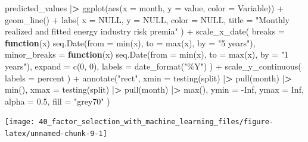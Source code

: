 \documentclass[
]{krantz}
\newenvironment{Shaded}{\begin{snugshade}}{\end{snugshade}}
\newcommand{\AttributeTok}[1]{\textcolor[rgb]{0.61,0.61,0.61}{#1}}
\newcommand{\ConstantTok}[1]{\textcolor[rgb]{0,0,0}{#1}}
\newcommand{\ControlFlowTok}[1]{\textcolor[rgb]{0.27,0.27,0.27}{\textbf{#1}}}
\newcommand{\DecValTok}[1]{\textcolor[rgb]{0.06,0.06,0.06}{#1}}
\newcommand{\ErrorTok}[1]{\textcolor[rgb]{0.14,0.14,0.14}{\textbf{#1}}}
\newcommand{\FloatTok}[1]{\textcolor[rgb]{0.06,0.06,0.06}{#1}}
\newcommand{\FunctionTok}[1]{\textcolor[rgb]{0,0,0}{#1}}
\newcommand{\NormalTok}[1]{#1}
\newcommand{\SpecialCharTok}[1]{\textcolor[rgb]{0,0,0}{#1}}
\newcommand{\StringTok}[1]{\textcolor[rgb]{0.5,0.5,0.5}{#1}}
\begin{document}
\begin{Shaded}
\begin{Highlighting}[]
\NormalTok{predicted\_values }\SpecialCharTok{|}\ErrorTok{\textgreater{}}
  \FunctionTok{ggplot}\NormalTok{(}\FunctionTok{aes}\NormalTok{(}\AttributeTok{x =}\NormalTok{ month, }\AttributeTok{y =}\NormalTok{ value, }\AttributeTok{color =}\NormalTok{ Variable)) }\SpecialCharTok{+}
  \FunctionTok{geom\_line}\NormalTok{() }\SpecialCharTok{+}
  \FunctionTok{labs}\NormalTok{(}
    \AttributeTok{x =} \ConstantTok{NULL}\NormalTok{,}
    \AttributeTok{y =} \ConstantTok{NULL}\NormalTok{,}
    \AttributeTok{color =} \ConstantTok{NULL}\NormalTok{,}
    \AttributeTok{title =} \StringTok{"Monthly realized and fitted energy industry risk premia"}
\NormalTok{  ) }\SpecialCharTok{+}
  \FunctionTok{scale\_x\_date}\NormalTok{(}
    \AttributeTok{breaks =} \ControlFlowTok{function}\NormalTok{(x) }\FunctionTok{seq.Date}\NormalTok{(}\AttributeTok{from =} \FunctionTok{min}\NormalTok{(x), }\AttributeTok{to =} \FunctionTok{max}\NormalTok{(x), }\AttributeTok{by =} \StringTok{"5 years"}\NormalTok{),}
    \AttributeTok{minor\_breaks =} \ControlFlowTok{function}\NormalTok{(x) }\FunctionTok{seq.Date}\NormalTok{(}\AttributeTok{from =} \FunctionTok{min}\NormalTok{(x), }\AttributeTok{to =} \FunctionTok{max}\NormalTok{(x), }\AttributeTok{by =} \StringTok{"1 years"}\NormalTok{),}
    \AttributeTok{expand =} \FunctionTok{c}\NormalTok{(}\DecValTok{0}\NormalTok{, }\DecValTok{0}\NormalTok{),}
    \AttributeTok{labels =} \FunctionTok{date\_format}\NormalTok{(}\StringTok{"\%Y"}\NormalTok{)}
\NormalTok{  ) }\SpecialCharTok{+}
  \FunctionTok{scale\_y\_continuous}\NormalTok{(}
    \AttributeTok{labels =}\NormalTok{ percent}
\NormalTok{  ) }\SpecialCharTok{+}
  \FunctionTok{annotate}\NormalTok{(}\StringTok{"rect"}\NormalTok{,}
    \AttributeTok{xmin =} \FunctionTok{testing}\NormalTok{(split) }\SpecialCharTok{|}\ErrorTok{\textgreater{}} \FunctionTok{pull}\NormalTok{(month) }\SpecialCharTok{|}\ErrorTok{\textgreater{}} \FunctionTok{min}\NormalTok{(),}
    \AttributeTok{xmax =} \FunctionTok{testing}\NormalTok{(split) }\SpecialCharTok{|}\ErrorTok{\textgreater{}} \FunctionTok{pull}\NormalTok{(month) }\SpecialCharTok{|}\ErrorTok{\textgreater{}} \FunctionTok{max}\NormalTok{(),}
    \AttributeTok{ymin =} \SpecialCharTok{{-}}\ConstantTok{Inf}\NormalTok{, }\AttributeTok{ymax =} \ConstantTok{Inf}\NormalTok{,}
    \AttributeTok{alpha =} \FloatTok{0.5}\NormalTok{, }\AttributeTok{fill =} \StringTok{"grey70"}
\NormalTok{  )}
\end{Highlighting}
\end{Shaded}

\begin{center}\texttt{[image: 40\_factor\_selection\_with\_machine\_learning\_files/figure-latex/unnamed-chunk-9-1]} \end{center}
\end{document}
